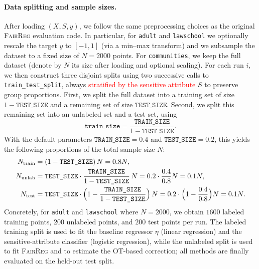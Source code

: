\documentclass[11pt]{article}
\begin{document}
\paragraph{Data splitting and sample sizes.}
After loading $(X,S,y)$, we follow the same preprocessing choices as the original \textsc{FairReg} evaluation code. 
In particular, for \texttt{adult} and \texttt{lawschool} we optionally rescale the target $y$ to $[-1,1]$ (via a min--max transform) and we subsample the dataset to a fixed size of $N=2000$ points. 
For \texttt{communities}, we keep the full dataset (denote by $N$ its size after loading and optional scaling). 
For each run $i$, we then construct three disjoint splits using two successive calls to \texttt{train\_test\_split}, always \textcolor{red}{stratified by the sensitive attribute} $S$ to preserve group proportions. 
First, we split the full dataset into a training set of size $1-\texttt{TEST\_SIZE}$ and a remaining set of size $\texttt{TEST\_SIZE}$. 
Second, we split this remaining set into an unlabeled set and a test set, using
\[
\texttt{train\_size}=\frac{\texttt{TRAIN\_SIZE}}{1-\texttt{TEST\_SIZE}}.
\]
With the default parameters $\texttt{TRAIN\_SIZE}=0.4$ and $\texttt{TEST\_SIZE}=0.2$, this yields the following proportions of the total sample size $N$:
\begin{align*}
N_{\text{train}} &= (1-\texttt{TEST\_SIZE})\,N = 0.8N,\\
N_{\text{unlab}} &= \texttt{TEST\_SIZE}\cdot\frac{\texttt{TRAIN\_SIZE}}{1-\texttt{TEST\_SIZE}}\,N 
= 0.2\cdot\frac{0.4}{0.8}N = 0.1N,\\
N_{\text{test}}  &= \texttt{TEST\_SIZE}\cdot\Bigl(1-\frac{\texttt{TRAIN\_SIZE}}{1-\texttt{TEST\_SIZE}}\Bigr)\,N
= 0.2\cdot\Bigl(1-\frac{0.4}{0.8}\Bigr)N = 0.1N.
\end{align*}
Concretely, for \texttt{adult} and \texttt{lawschool} where $N=2000$, we obtain $1600$ labeled training points, $200$ unlabeled points, and $200$ test points per run. 
The labeled training split is used to fit the baseline regressor $\eta$ (linear regression) and the sensitive-attribute classifier (logistic regression), while the unlabeled split is used to fit \textsc{FairReg} and to estimate the OT-based correction; all methods are finally evaluated on the held-out test split.

\end{document}
